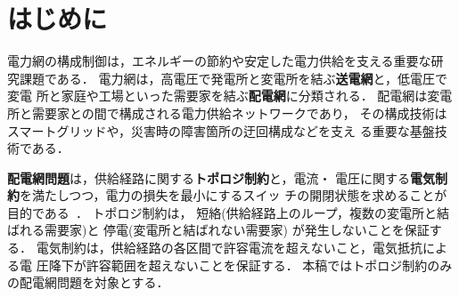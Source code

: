\section{はじめに}\label{chap:intro}

電力網の構成制御は，エネルギーの節約や安定した電力供給を支える重要な研
究課題である．
電力網は，高電圧で発電所と変電所を結ぶ\textbf{送電網}と，低電圧で変電
所と家庭や工場といった需要家を結ぶ\textbf{配電網}に分類される．
配電網は変電所と需要家との間で構成される電力供給ネットワークであり，
その構成技術はスマートグリッドや，災害時の障害箇所の迂回構成などを支え
る重要な基盤技術である．

\textbf{配電網問題}は，供給経路に関する\textbf{トポロジ制約}と，電流・
電圧に関する\textbf{電気制約}を満たしつつ，電力の損失を最小にするスイッ
チの開閉状態を求めることが目的である~\cite{Hayashi:dnet:model}．
トポロジ制約は，
短絡(供給経路上のループ，複数の変電所と結ばれる需要家)と
停電(変電所と結ばれない需要家)
が発生しないことを保証する．
電気制約は，供給経路の各区間で許容電流を超えないこと，電気抵抗による電
圧降下が許容範囲を超えないことを保証する．
本稿ではトポロジ制約のみの配電網問題を対象とする．




%  







